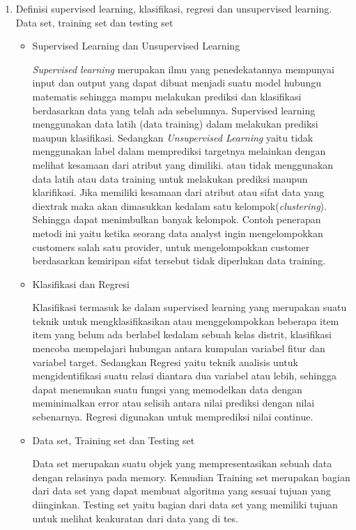 \begin{enumerate}
\item Definisi supervised learning, klasifikasi, regresi dan unsupervised learning. Data set, training set dan testing set
\begin{itemize}
    \item Supervised Learning dan Unsupervised Learning
    \par
    \textit{Supervised learning} merupakan ilmu yang penedekatannya mempunyai input dan output yang dapat dibuat menjadi suatu model hubungu matematis sehingga mampu melakukan prediksi dan klasifikasi berdasarkan data yang telah ada sebelumnya.  Supervised learning menggunakan data latih (data training) dalam melakukan prediksi maupun klasifikasi. Sedangkan \textit{Unsupervised Learning} yaitu tidak menggunakan label dalam memprediksi targetnya melainkan dengan melihat kesamaan dari atribut yang dimiliki. atau tidak menggunakan data latih atau data training untuk melakukan prediksi maupun klarifikasi. Jika memiliki kesamaan dari atribut atau sifat data yang diextrak maka akan dimasukkan kedalam satu kelompok(\textit{clustering}). Sehingga dapat menimbulkan banyak kelompok. Contoh penerapan metodi ini yaitu ketika seorang data analyst ingin mengelompokkan customers salah satu provider, untuk mengelompokkan customer berdasarkan kemiripan sifat tersebut tidak diperlukan data training.
    
    \item Klasifikasi dan Regresi
    \par
    Klasifikasi termasuk ke dalam supervised learning yang merupakan suatu teknik untuk  mengklasifikasikan atau menggelompokkan beberapa item item yang belum ada berlabel kedalam sebuah kelas distrit, klasifikasi mencoba mempelajari hubungan antara kumpulan variabel fitur dan variabel target. Sedangkan Regresi yaitu teknik analisis untuk mengidentifikasi suatu relasi diantara dua variabel atau lebih, sehingga dapat menemukan suatu fungsi yang memodelkan data dengan meminimalkan error atau selisih antara nilai prediksi dengan nilai sebenarnya. Regresi digunakan untuk memprediksi nilai continue. 
    
    \item Data set, Training set dan Testing set
    \par
    Data set merupakan suatu objek yang mempresentasikan sebuah data dengan relasinya pada memory. Kemudian Training set merupakan bagian dari data set yang dapat membuat algoritma yang sesuai tujuan yang diinginkan. Testing set yaitu bagian dari data set yang memiliki tujuan untuk melihat keakuratan dari data yang di tes.
\end{itemize}
\end{enumerate}

